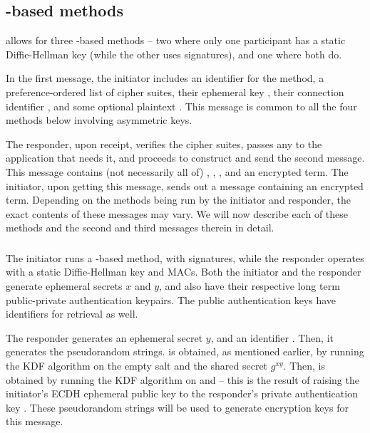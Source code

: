 {\subsection{\mStat-based methods}
\mEdhoc{} allows for three \mStat-based methods -- two where only one participant has a static Diffie-Hellman key (while the other uses signatures), and one where both do. 

In the first message, the initiator includes an identifier for the method, a preference-ordered list of cipher suites, their ephemeral key \mGx, their connection identifier \mCi, and some optional plaintext \mADone. This message is common to all the four methods below involving asymmetric keys. 

The responder, upon receipt, verifies the cipher suites, passes any \mADone to the application that needs it, and proceeds to construct and send the second message. This message contains (not necessarily all of) \mCi, \mGy, \mCr, and an encrypted term. The initiator, upon getting this message, sends out a message containing an encrypted term. Depending on the methods being run by the initiator and responder, the exact contents of these messages may vary. We will now describe each of these methods and the second and third messages therein in detail.

\subsubsection{\mSigStat}
The initiator runs a \mSigma-based method, with signatures, while the responder operates with a static Diffie-Hellman key and MACs. Both the initiator and the responder generate ephemeral secrets $x$ and $y$, and also have their respective long term public-private authentication keypairs. The public authentication keys have identifiers for retrieval as well.

The responder generates an ephemeral secret $y$, and an identifier \mCr. Then, it generates the pseudorandom strings. \mPRKtwo is obtained, as mentioned earlier, by running the KDF algorithm on the empty salt and the shared secret $g^{xy}$. Then, \mPRKthree is obtained by running the KDF algorithm on \mPRKtwo and \mGrx -- this is the result of raising the initiator's ECDH ephemeral public key \mGx to the responder's private authentication key \mLtkr. These pseudorandom strings will be used to generate encryption keys for this message.

}
